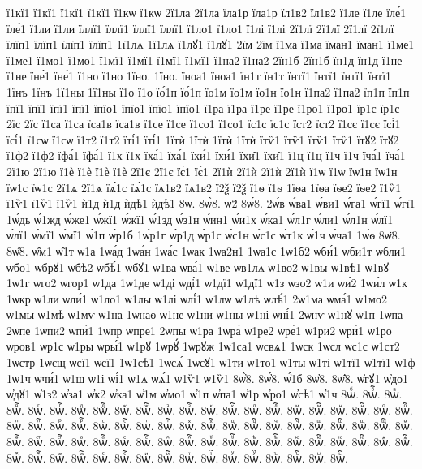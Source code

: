 {ї1кї1
ї1кї1
ї1кї1
ї1кї1
ї1кѡ
ї1кѡ
2ї1ла
2ї1ла
їла1р
їла1р
їл1в2
їл1в2
ї1ле
ї1ле
їле́1
їле́1
ї1ли
ї1ли
їллї1
їллї1
їллї1
їллї1
ї1ло1
ї1ло1
ї1лі
ї1лі
2ї1лї
2ї1лї
2ї1лї
2ї1лї
їлїп1
їлїп1
їлїп1
їлїп1
1ї1лѧ
1ї1лѧ
ї1лꙋ1
ї1лꙋ1
2їм
2їм
ї1ма
ї1ма
їман1
їман1
ї1ме1
ї1ме1
ї1мо1
ї1мо1
ї1мї1
ї1мї1
ї1мї1
ї1мї1
ї1на2
ї1на2
2їн1б
2їн1б
їн1д
їн1д
ї1не
ї1не
їне́1
їне́1
ї1но
ї1но
1їно.
1їно.
їноа1
їноа1
їн1т
їн1т
їнтї1
їнтї1
їнтї1
їнтї1
1їнъ
1їнъ
1ї1ны
1ї1ны
ї1о
ї1о
їо́1п
їо́1п
їо1м
їо1м
їо1н
їо1н
ї1па2
ї1па2
їп1п
їп1п
їпї1
їпї1
їпї1
їпї1
їпїо1
їпїо1
їпїо1
їпїо1
ї1ра
ї1ра
ї1ре
ї1ре
ї1ро1
ї1ро1
їр1с
їр1с
2їс
2їс
ї1са
ї1са
їса1в
їса1в
ї1се
ї1се
ї1со1
ї1со1
їс1с
їс1с
їст2
їст2
ї1сє
ї1сє
їсі́1
їсі́1
ї1сѡ
ї1сѡ
ї1т2
ї1т2
їті́1
їті́1
1їтѝ
1їтѝ
1їтѝ
1їтѝ
їтѷ1
їтѷ1
їтѷ1
їтѷ1
їтꙋ2
їтꙋ2
ї1ф2
ї1ф2
їфа́1
їфа́1
ї1х
ї1х
їха́1
їха́1
їхи́1
їхи́1
їхи̑1
їхи̑1
ї1ц
ї1ц
ї1ч
ї1ч
їча́1
їча́1
2ї1ю
2ї1ю
ї1ѐ
ї1ѐ
ї1ѐ
ї1ѐ
2ї1є
2ї1є
їє́1
їє́1
2ї1ѝ
2ї1ѝ
2ї1ѝ
2ї1ѝ
ї1ѡ
ї1ѡ
їѡ1н
їѡ1н
їѡ1с
їѡ1с
2ї1ѧ
2ї1ѧ
їѧ́1с
їѧ́1с
їѧ1в2
їѧ1в2
ї2ѯ
ї2ѯ
ї1ѳ
ї1ѳ
1їѳа
1їѳа
їѳе2
їѳе2
ї1ѷ1
ї1ѷ1
ї1ѷ1
ї1ѷ1
ѝ1д
ѝ1д
ѝдѣ1
ѝдѣ1
8ѡ.
8ѡ̀8.
ѡ2́
8ѡ́8.
2ѡ́в
ѡ́ва1
ѡ́ви1
ѡ́га1
ѡ́гї1
ѡ́гї1
1ѡ́дь
ѡ́1жд
ѡ́же1
ѡ́жї1
ѡ́жї1
ѡ́1зд
ѡ́з1н
ѡ́ин1
ѡ́и1х
ѡ́ка1
ѡ́л1г
ѡ́ли1
ѡ́л1н
ѡ́лї1
ѡ́лї1
ѡ́мї1
ѡ́мї1
ѡ́1п
ѡ́р1б
1ѡ́р1г
ѡ́р1д
ѡ́р1с
ѡ́с1н
ѡ́с1с
ѡ́т1к
ѡ́1ч
ѡ́ча1
1ѡ́ѳ
8ѡ̈8.
8ѡ̑8.
ѡ̑м1
ѡ̑1т
ѡ1а
1ѡа́д
1ѡа́н
1ѡа́с
1ѡак
1ѡа2н1
1ѡа1с
1ѡ1б2
ѡби́1
ѡби1т
ѡбли1
ѡбо1
ѡбрꙋ1
ѡбѣ2
ѡбѣ́1
ѡбꙋ1
ѡ1ва
ѡва́1
ѡ1ве
ѡв1лѧ
ѡ1во2
ѡ1вы
ѡ1вѣ1
ѡ1вꙋ
1ѡ1г
ѡго2
ѡгор1
ѡ1да
1ѡ1де
ѡ1ді
ѡді́1
ѡ1дї1
ѡ1дї1
ѡ1з
ѡзо2
ѡ1и
ѡи́2
1ѡи́л
ѡ1к
1ѡкр
ѡ1ли
ѡли́1
ѡ1ло1
ѡ1лы
ѡ1лі
ѡлі́1
ѡ1лѡ
ѡ1лѣ
ѡлѣ́1
2ѡ1ма
ѡма́1
ѡ1мо2
ѡ1мы
ѡ1мѣ
ѡ1мѵ
ѡ1на
1ѡнаѳ
ѡ1не
ѡ1ни
ѡ1ны
ѡ1ні
ѡні́1
2ѡнѵ
ѡ1нꙋ
ѡ1п
1ѡпа
2ѡпе
1ѡпи2
ѡпи́1
1ѡпр
ѡпре1
2ѡпы
ѡ1ра
1ѡра́
ѡ1ре2
ѡре́1
ѡ1ри2
ѡри́1
ѡ1ро
ѡров1
ѡр1с
ѡ1ры
ѡры́1
ѡ1рꙋ
1ѡрꙋ́
1ѡрꙋж
1ѡ1са1
ѡсвѧ1
1ѡск
1ѡсл
ѡс1с
ѡ1ст2
1ѡстр
1ѡсщ
ѡсї1
ѡсї1
1ѡ1сѣ1
1ѡсѧ́
1ѡсꙋ1
ѡ1ти
ѡ1то1
ѡ1ты
ѡ1ті
ѡ1тї1
ѡ1тї1
ѡ1ф
1ѡ1ч
ѡчи́1
ѡ1ш
ѡ1і
ѡі́1
ѡ1ѧ
ѡѧ́1
ѡ1ѷ1
ѡ1ѷ1
8ѡ҆̀8.
8ѡ҆́8.
ѡ҆́1б
8ѡ҆̈8.
8ѡ҆̑8.
ѡ҆гꙋ1
ѡ҆до1
ѡ҆дꙋ1
ѡ҆1з2
ѡ҆за1
ѡ҆к2
ѡ҆ка1
ѡ҆1м
ѡ҆мо1
ѡ҆1п
ѡ҆па1
ѡ҆1р
ѡ҆ро1
ѡ҆сѣ1
ѡ҆1ч
8ѡⷠ.
8ѡⷠ҇.
8ѡⷡ.
8ѡⷡ҇.
8ѡⷢ.
8ѡⷢ҇.
8ѡⷣ.
8ѡⷣ҇.
8ѡⷤ.
8ѡⷤ҇.
8ѡⷥ.
8ѡⷥ҇.
8ѡⷦ.
8ѡⷦ҇.
8ѡⷧ.
8ѡⷧ҇.
8ѡⷨ.
8ѡⷨ҇.
8ѡⷩ.
8ѡⷩ҇.
8ѡⷪ.
8ѡⷪ҇.
8ѡⷫ.
8ѡⷫ҇.
8ѡⷬ.
8ѡⷬ҇.
8ѡⷭ.
8ѡⷭ҇.
8ѡⷮ.
8ѡⷮ҇.
8ѡⷯ.
8ѡⷯ҇.
8ѡⷰ.
8ѡⷰ҇.
8ѡⷱ.
8ѡⷱ҇.
8ѡⷲ.
8ѡⷲ҇.
8ѡⷳ.
8ѡⷳ҇.
8ѡⷴ.
8ѡⷴ҇.
8ѡⷵ.
8ѡⷵ҇.
8ѡⷶ.
8ѡⷶ҇.
8ѡⷷ.
8ѡⷷ҇.
8ѡⷸ.
8ѡⷸ҇.
8ѡⷹ.
8ѡⷹ҇.
8ѡⷺ.
8ѡⷺ҇.
8ѡⷻ.
8ѡⷻ҇.
8ѡⷼ.
8ѡⷼ҇.
8ѡⷽ.
8ѡⷽ҇.
8ѡⷾ.
8ѡⷾ҇.
8ѡⷿ.
8ѡⷿ҇.
8ѡꙴ.
8ѡꙴ҇.
8ѡꙵ.
8ѡꙵ҇.
8ѡꙶ.
8ѡꙶ҇.
8ѡꙷ.
8ѡꙷ҇.
8ѡꙸ.
8ѡꙸ҇.
8ѡꙹ.
8ѡꙹ҇.
}
